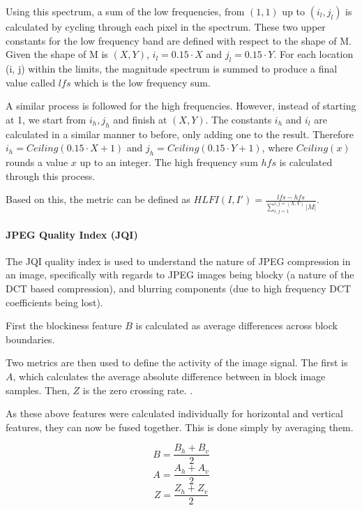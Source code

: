 \documentclass[10pt,a4paper]{article}
\begin{document}
                Using this spectrum, a sum of the low frequencies, from $(1,1)$ up to $(i_l, j_l)$ is calculated by cycling through each pixel in the spectrum. These two upper constants for
                the low frequency band are defined with respect to the shape of M. Given the shape of M is $(X, Y)$, $i_l = 0.15 \cdot X$ and $j_l = 0.15 \cdot Y$.
                For each location (i, j) within the limits, the magnitude spectrum is summed to produce a final value called $lfs$ which is the low frequency sum.

                A similar process is followed for the high frequencies. However, instead of starting at 1, we start from $i_h, j_h$ and finish at $(X, Y)$. The constants $i_h$ and $i_l$ are
                calculated in a similar manner to before, only adding one to the result. Therefore $i_h = Ceiling(0.15 \cdot X + 1)$ and $j_h = Ceiling(0.15 \cdot Y + 1)$, where $Ceiling(x)$ rounds
                a value $x$ up to an integer. The high frequency sum $hfs$ is calculated through this process.

                Based on this, the metric can be defined as $HLFI(I, I') = \frac{lfs - hfs}{\sum_{i,j = 1}^{i,j = (X, Y)} |M|}$.
                
            \paragraph{JPEG Quality Index (JQI)}
                The JQI quality index is used to understand the nature of JPEG compression in an image, specifically with regards to JPEG images being blocky (a nature of the DCT based compression),
                and blurring components (due to high frequency DCT coefficients being lost).

                First the blockiness feature $B$ is calculated as average differences across block boundaries. 
                
                Two metrics are then used to define the activity of the image signal. The first is $A$, which calculates the average absolute difference between in block image samples.
                Then, $Z$ is the zero crossing rate. .

                As these above features were calculated individually for horizontal and vertical features, they can now be fused together. This is done simply by averaging them.

                $$B = \frac{B_h + B_v}{2}$$
                $$A = \frac{A_h + A_v}{2}$$
                $$Z = \frac{Z_h + Z_v}{2}$$
\end{document}
